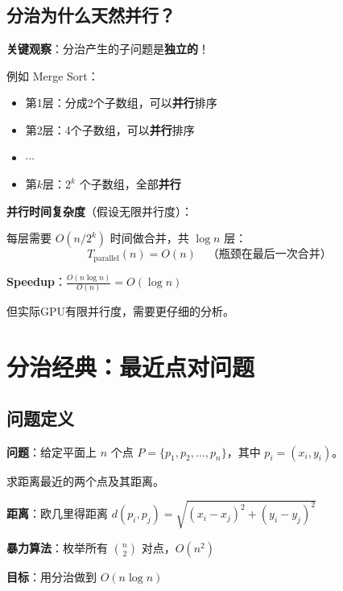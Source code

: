 \documentclass[12pt, a4paper]{ctexart}
\begin{document}
\subsection{分治为什么天然并行？}

\begin{gpubox}[分治的并行性]

\textbf{关键观察}：分治产生的子问题是\textbf{独立的}！

例如 Merge Sort：
\begin{itemize}
    \item 第1层：分成2个子数组，可以\textbf{并行}排序
    \item 第2层：4个子数组，可以\textbf{并行}排序
    \item $\cdots$
    \item 第$k$层：$2^k$ 个子数组，全部\textbf{并行}
\end{itemize}

\textbf{并行时间复杂度}（假设无限并行度）：

每层需要 $O(n/2^k)$ 时间做合并，共 $\log n$ 层：
\[
T_{\text{parallel}}(n) = O(n) \quad \text{（瓶颈在最后一次合并）}
\]

\textbf{Speedup}：$\frac{O(n \log n)}{O(n)} = O(\log n)$

但实际GPU有限并行度，需要更仔细的分析。

\end{gpubox}

\section{分治经典：最近点对问题}

\subsection{问题定义}

\begin{blackboard}[最近点对问题]

\textbf{问题}：给定平面上 $n$ 个点 $P = \{p_1, p_2, \ldots, p_n\}$，其中 $p_i = (x_i, y_i)$。

求距离最近的两个点及其距离。

\textbf{距离}：欧几里得距离 $d(p_i, p_j) = \sqrt{(x_i - x_j)^2 + (y_i - y_j)^2}$

\textbf{暴力算法}：枚举所有 $\binom{n}{2}$ 对点，$O(n^2)$

\textbf{目标}：用分治做到 $O(n \log n)$

\end{blackboard}
\end{document}
